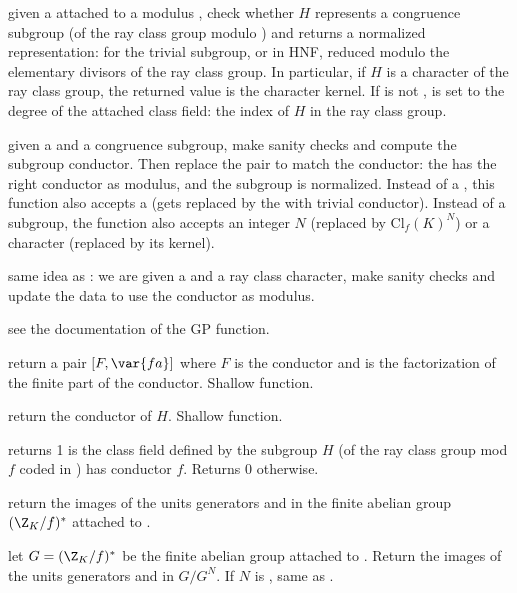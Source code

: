  given a 
attached to a modulus , check whether $H$ represents a congruence
subgroup (of the ray class group modulo ) and returns a normalized
representation:  for the trivial subgroup, or in HNF, reduced
modulo the elementary divisors of the ray class group. In particular, if $H$
is a character of the ray class group, the returned value is the character
kernel. If  is not ,  is set to the degree of the
attached class field: the index of $H$ in the ray class group.

 given a 
and a congruence subgroup, make sanity checks and compute the subgroup
conductor. Then replace the pair to match the conductor: the 
has the right conductor as modulus, and the subgroup is normalized.
Instead of a , this function also accepts a  (gets replaced
by the  with trivial conductor). Instead of a subgroup,
the function also accepts an integer $N$ (replaced by $\text{Cl}_f(K)^N$)
or a character (replaced by its kernel).

 same idea as
: we are given a 
and a ray class character, make sanity checks and update the data
to use the conductor as modulus.

 see the documentation of
the GP function.

return a pair $[F,\var{fa}]$ where $F$ is the conductor and  is the
factorization of the finite part of the conductor. Shallow function.

 return the conductor of $H$.
Shallow function.

 returns 1 is the class field
defined by the subgroup $H$ (of the ray class group mod $f$ coded in )
has conductor $f$. Returns 0 otherwise.

 return the images of the units
generators  and  in the finite abelian group
$(\Z_K/f)^*$ attached to .

 let
$G = (\Z_K/f)^*$ be the finite abelian group attached to .
Return the images of the units generators  and  in
$G / G^N$. If $N$ is , same as .

